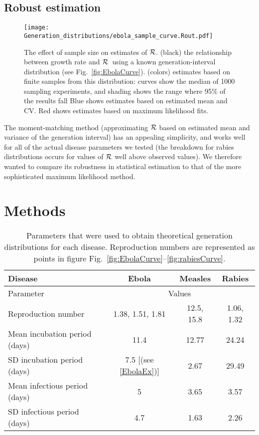 \documentclass[12pt,]{article}
\newcommand{\RR}{\ensuremath{{\cal R}}}
\newcommand{\fref}[1]{Fig.~\ref{fig:#1}}
\newcommand{\frange}[2]{Fig.~\ref{fig:#1}--\ref{fig:#2}}
\newcommand{\tlab}[1]{\label{tab:#1}}
\begin{document}
\subsection{Robust estimation}


\begin{figure}[htbp] \centering
	\texttt{[image: Generation\_distributions/ebola\_sample\_curve.Rout.pdf]}
\caption{
%
The effect of sample size on estimates of \RR.
(black) the relationship between growth rate and \RR~using a known generation-interval distribution (see \fref{EbolaCurve}).
(colors) estimates based on finite samples from this distribution: curves show the median of 1000 sampling experiments, and shading shows the range where 95\% of the results fall
Blue shows estimates based on estimated mean and CV.
Red shows estimates based on maximum likelihood fits.
%
}
	\label{fig:ebolaSample}
\end{figure}


The moment-matching method (approximating $\RR$ based on estimated mean and variance of the generation interval) has an appealing simplicity, and works well for all of the actual disease parameters we tested (the breakdown for rabies distributions occurs for values of $\RR$ well above observed values). We therefore wanted to compare its robustness in statistical estimation to that of the more sophisticated maximum likelihood method.

\section{Methods}

\begin{table}[h!]
\centering
\begin{tabular}{l*{3}{c}}
\hline
Disease & Ebola & Measles & Rabies\\
\hline
Parameter & \multicolumn{3}{c}{Values}\\
\hline
Reproduction number & 1.38, 1.51, 1.81 \cite{WHO14} & 12.5, 15.8 \cite{AndeMay82} & 1.06, 1.32 \cite{HampDush09} \\
Mean incubation period (days) & 11.4 \cite{WHO14} & 12.77 \cite{LessReic09inc}  & 24.24 \cite{HampDush09} \\
SD incubation period (days) & 7.5 [(see \ref{EbolaEx})] & 2.67 \cite{LessReic09inc} & 29.49 \cite{HampDush09} \\
Mean infectious period (days) & 5 \cite{WHO14} & 3.65 \cite{Lloy01} & 3.57 \cite{HampDush09} \\
SD infectious period (days) & 4.7 \cite{WHO14} & 1.63 \cite{Lloy01} & 2.26 \cite{HampDush09}
\end{tabular}
\caption{Parameters that were used to obtain theoretical generation distributions for each disease. Reproduction numbers are represented as points in figure \frange{EbolaCurve}{rabiesCurve}.}
\tlab{parameters}
\end{table}
\end{document}
